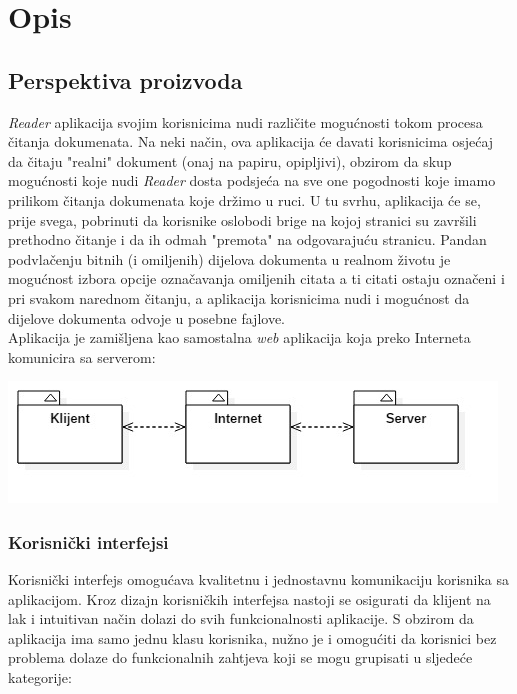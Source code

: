 \chapter{Opis}

\section{Perspektiva proizvoda}

\textit{Reader} aplikacija svojim korisnicima nudi različite mogućnosti tokom procesa čitanja dokumenata. Na neki način, ova aplikacija će davati korisnicima osjećaj da čitaju "realni" dokument (onaj na papiru, opipljivi), obzirom da skup mogućnosti koje nudi \textit{Reader} dosta podsjeća na sve one pogodnosti koje imamo prilikom čitanja dokumenata koje držimo u ruci. U tu svrhu, aplikacija će se, prije svega, pobrinuti da korisnike oslobodi brige na kojoj stranici su završili prethodno čitanje i da ih odmah "premota" na odgovarajuću stranicu. Pandan podvlačenju bitnih (i omiljenih) dijelova dokumenta u realnom životu je mogućnost izbora opcije označavanja omiljenih citata a ti citati ostaju označeni i pri svakom narednom čitanju, a aplikacija korisnicima nudi i mogućnost da dijelove dokumenta odvoje u posebne fajlove. \\

Aplikacija je zamišljena kao samostalna \textit{web} aplikacija koja preko Interneta komunicira sa serverom:
\begin{center}
    \includegraphics[scale=0.7]{images/dijagram1.jpg}
\end{center}

\subsection{Korisnički interfejsi}

Korisnički interfejs omogućava kvalitetnu i jednostavnu komunikaciju korisnika sa aplikacijom. Kroz dizajn korisničkih interfejsa nastoji se osigurati da klijent na lak i intuitivan način dolazi do svih funkcionalnosti aplikacije. S obzirom da aplikacija ima samo jednu klasu korisnika, nužno je i omogućiti da korisnici bez problema dolaze do funkcionalnih zahtjeva koji se mogu grupisati u sljedeće kategorije:

